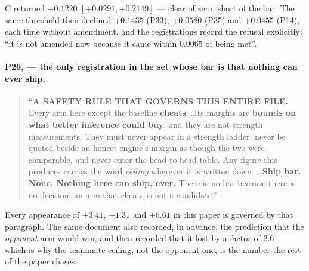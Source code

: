 \noindent C returned $+0.1220$ $[+0.0291, +0.2149]$ --- clear of zero, short of
the bar. The same threshold then declined $+0.1435$ (P33), $+0.0580$ (P35) and
$+0.0455$ (P14), each time without amendment, and the registrations record the
refusal explicitly: ``it is not amended now because it came within $0.0065$ of
being met''.

\paragraph{P26, \protect{} --- the only
registration in the set whose bar is that nothing can ever ship.}

\begin{quote}
``\textbf{A SAFETY RULE THAT GOVERNS THIS ENTIRE FILE.} Every arm here except
the baseline \textbf{cheats} \ldots Its margins are \textbf{bounds on what
better inference could buy}, and they are not strength measurements. They must
never appear in a strength ladder, never be quoted beside an honest engine's
margin as though the two were comparable, and never enter the head-to-head
table. Any figure this produces carries the word \emph{ceiling} wherever it is
written down. \ldots \textbf{Ship bar. None. Nothing here can ship, ever.}
There is no bar because there is no decision: an arm that cheats is not a
candidate.''
\end{quote}

\noindent Every appearance of $+3.41$, $+1.31$ and $+6.61$ in this paper is
governed by that paragraph. The same document also recorded, in advance, the
prediction that the \emph{opponent} arm would win, and then recorded that it
lost by a factor of $2.6$ --- which is why the teammate ceiling, not the
opponent one, is the number the rest of the paper chases.
